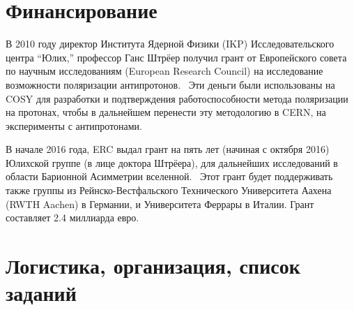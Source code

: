 \documentclass{extarticle}
\begin{document}
\section{Финансирование}
В 2010 году директор Института Ядерной Физики (IKP) Исследовательского центра ``Юлих,'' профессор Ганс Штрёер получил грант от Европейского совета по научным исследованиям (European Research Council) на исследование возможности поляризации антипротонов.~\cite{ERCGrant10} Эти деньги были использованы на COSY для разработки и подтверждения работоспособности метода поляризации на протонах, чтобы в дальнейшем перенести эту методологию в CERN, на эксперименты с антипротонами.

В начале 2016 года, ERC выдал грант на пять лет (начиная с октября 2016) Юлихской группе (в лице доктора Штрёера), для дальнейших исследований в области Барионной Асимметрии вселенной.~\cite{ERCGrant16} Этот грант будет поддерживать также группы из Рейнско-Вестфальского Технического Университета Аахена (RWTH Aachen) в Германии, и Университета Феррары в Италии. Грант составляет 2.4 миллиарда евро.

\section{Логистика, организация, список заданий~\cite{ERCGrant12}}
\end{document}

